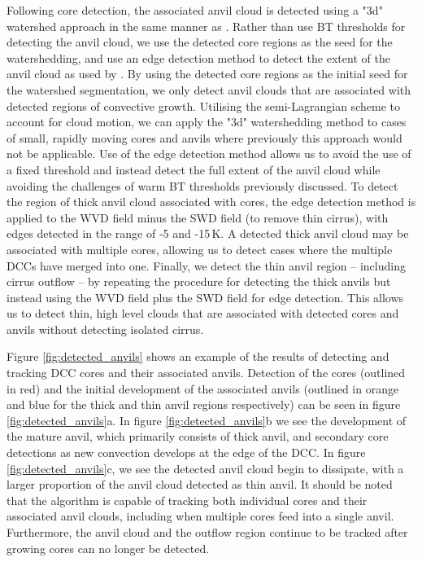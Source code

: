 Following core detection, the associated anvil cloud is detected using a "3d" watershed approach in the same manner as \citet{fiolleau_algorithm_2013}.
Rather than use BT thresholds for detecting the anvil cloud, we use the detected core regions as the seed for the watershedding, and use an edge detection method to detect the extent of the anvil cloud as used by \citet{dim_alternative_2013}.
By using the detected core regions as the initial seed for the watershed segmentation, we only detect anvil clouds that are associated with detected regions of convective growth.
Utilising the semi-Lagrangian scheme to account for cloud motion, we can apply the "3d" watershedding method to cases of small, rapidly moving cores and anvils where previously this approach would not be applicable.
Use of the edge detection method allows us to avoid the use of a fixed threshold and instead detect the full extent of the anvil cloud while avoiding the challenges of warm BT thresholds previously discussed.
To detect the region of thick anvil cloud associated with cores, the edge detection method is applied to the WVD field minus the SWD field (to remove thin cirrus), with edges detected in the range of -5 and -15\,\unit{K}.
A detected thick anvil cloud may be associated with multiple cores, allowing us to detect cases where the multiple DCCs have merged into one.
Finally, we detect the thin anvil region -- including cirrus outflow -- by repeating the procedure for detecting the thick anvils but instead using the WVD field plus the SWD field for edge detection.
This allows us to detect thin, high level clouds that are associated with detected cores and anvils without detecting isolated cirrus.

Figure \ref{fig:detected_anvils} shows an example of the results of detecting and tracking DCC cores and their associated anvils.
Detection of the cores (outlined in red) and the initial development of the associated anvils (outlined in orange and blue for the thick and thin anvil regions respectively) can be seen in figure \ref{fig:detected_anvils}a.
In figure \ref{fig:detected_anvils}b we see the development of the mature anvil, which primarily consists of thick anvil, and secondary core detections as new convection develops at the edge of the DCC.
In figure \ref{fig:detected_anvils}c, we see the detected anvil cloud begin to dissipate, with a larger proportion of the anvil cloud detected as thin anvil.
It should be noted that the algorithm is capable of tracking both individual cores and their associated anvil clouds, including when multiple cores feed into a single anvil.
Furthermore, the anvil cloud and the outflow region continue to be tracked after growing cores can no longer be detected.

